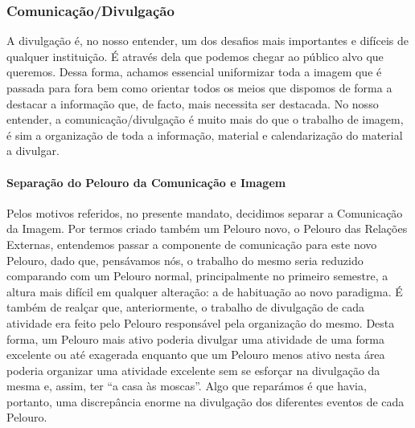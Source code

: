 
\subsubsection{Comunicação/Divulgação}

A divulgação é, no nosso entender, um dos desafios mais importantes e difíceis de qualquer instituição. É através dela que podemos chegar ao público alvo que queremos. Dessa forma, achamos essencial uniformizar toda a imagem que é passada para fora bem como orientar todos os meios que dispomos de forma a destacar a informação que, de facto, mais necessita ser destacada. No nosso entender, a comunicação/divulgação é muito mais do que o trabalho de imagem, é sim a organização de toda a informação, material e calendarização do material a divulgar.

\paragraph{Separação do Pelouro da Comunicação e Imagem}
Pelos motivos referidos, no presente mandato, decidimos separar a Comunicação da Imagem. Por termos criado também um Pelouro novo, o Pelouro das Relações Externas, entendemos passar a componente de comunicação para este novo Pelouro, dado que, pensávamos nós, o trabalho do mesmo seria reduzido comparando com um Pelouro normal, principalmente no primeiro semestre, a altura mais difícil em qualquer alteração: a de habituação ao novo paradigma. É também de realçar que, anteriormente, o trabalho de divulgação de cada atividade era feito pelo Pelouro responsável pela organização do mesmo. Desta forma, um Pelouro mais ativo poderia divulgar uma atividade de uma forma excelente ou até exagerada enquanto que um Pelouro menos ativo nesta área poderia organizar uma atividade excelente sem se esforçar na divulgação da mesma e, assim, ter “a casa às moscas”. Algo que reparámos é que havia, portanto, uma discrepância enorme na divulgação dos diferentes eventos de cada Pelouro.

